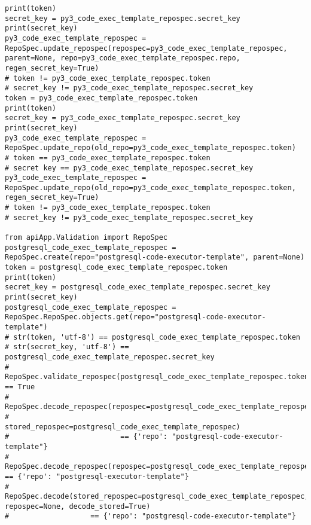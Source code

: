 \begin{lstlisting}[breaklines]
print(token)
secret_key = py3_code_exec_template_repospec.secret_key
print(secret_key)
py3_code_exec_template_repospec = RepoSpec.update_repospec(repospec=py3_code_exec_template_repospec, parent=None, repo=py3_code_exec_template_repospec.repo, regen_secret_key=True)
# token != py3_code_exec_template_repospec.token
# secret_key != py3_code_exec_template_repospec.secret_key
token = py3_code_exec_template_repospec.token
print(token)
secret_key = py3_code_exec_template_repospec.secret_key
print(secret_key)
py3_code_exec_template_repospec = RepoSpec.update_repo(old_repo=py3_code_exec_template_repospec.token)
# token == py3_code_exec_template_repospec.token
# secret key == py3_code_exec_template_repospec.secret_key
py3_code_exec_template_repospec = RepoSpec.update_repo(old_repo=py3_code_exec_template_repospec.token, regen_secret_key=True)
# token != py3_code_exec_template_repospec.token
# secret_key != py3_code_exec_template_repospec.secret_key

from apiApp.Validation import RepoSpec
postgresql_code_exec_template_repospec = RepoSpec.create(repo="postgresql-code-executor-template", parent=None)
token = postgresql_code_exec_template_repospec.token
print(token)
secret_key = postgresql_code_exec_template_repospec.secret_key
print(secret_key)
postgresql_code_exec_template_repospec = RepoSpec.RepoSpec.objects.get(repo="postgresql-code-executor-template")
# str(token, 'utf-8') == postgresql_code_exec_template_repospec.token
# str(secret_key, 'utf-8') == postgresql_code_exec_template_repospec.secret_key
# RepoSpec.validate_repospec(postgresql_code_exec_template_repospec.token) == True
# RepoSpec.decode_repospec(repospec=postgresql_code_exec_template_repospec.token,
#                          stored_repospec=postgresql_code_exec_template_repospec)
#                          == {'repo': "postgresql-code-executor-template"}
# RepoSpec.decode_repospec(repospec=postgresql_code_exec_template_repospec.token) == {'repo': "postgresql-executor-template"}
# RepoSpec.decode(stored_repospec=postgresql_code_exec_template_repospec, repospec=None, decode_stored=True)
#                   == {'repo': "postgresql-code-executor-template"}
\end{lstlisting}
\lstset{language=Bash}

